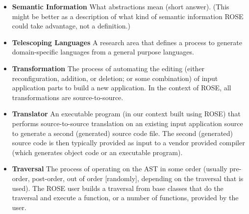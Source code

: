 \begin{itemize}
   \item {\bf Semantic Information} What abstractions mean (short answer).
    (This might be better as a description of what kind of semantic information ROSE could
    take advantage, not a definition.)

   \item {\bf Telescoping Languages} A research area that defines a process to generate
    domain-specific languages from a general purpose languages.

   \item {\bf Transformation} The process of automating the editing (either
    reconfiguration, addition, or deletion; or some combination) of input
    application parts to build a new application.  In the context of ROSE, all
    transformations are source-to-source.

   \item {\bf Translator} An executable program (in our context built using ROSE) that performs
    source-to-source translation on an existing input application source to generate 
    a second (generated) source code file.  The second (generated) source code is 
    then typically provided as input to a vendor provided compiler (which generates
    object code or an executable program).

   \item {\bf Traversal} The process of operating on the AST in some order (usually
    pre-order, post-order, out of order [randomly], depending on the traversal that is
    used). The ROSE user builds a traversal from base classes that do the
    traversal and execute a function, or a number of functions, provided by the user.

\end{itemize}






